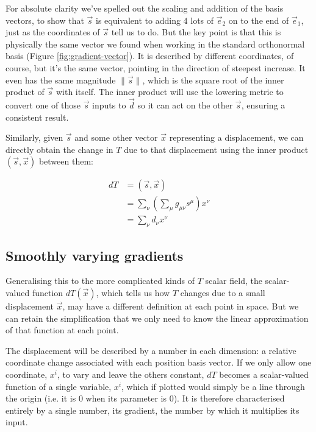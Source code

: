 For absolute clarity we've spelled out the scaling and addition of the basis vectors, to show that $\vec{s}$ is equivalent to adding $4$ lots of $\vec{e}_2$ on to the end of $\vec{e}_1$, just as the coordinates of $\vec{s}$ tell us to do. But the key point is that this is physically the same vector we found when working in the standard orthonormal basis (Figure \ref{fig:gradient-vector}). It is described by different coordinates, of course, but it's the same vector, pointing in the direction of steepest increase. It even has the same magnitude $\|\vec{s}\|$, which is the square root of the inner product of $\vec{s}$ with itself. The inner product will use the lowering metric to convert one of those $\vec{s}$ inputs to $\vec{d}$ so it can act on the other $\vec{s}$, ensuring a consistent result.

Similarly, given $\vec{s}$ and some other vector $\vec{x}$ representing a displacement, we can directly obtain the change in $T$ due to that displacement using the inner product $(\vec{s}, \vec{x})$ between them:

\begin{equation}
\begin{split}
dT &= (\vec{s}, \vec{x}) \\
   &= \sum_{\nu} \left( \sum_{\mu} g_{\mu\nu} s^{\mu} \right) x^{\nu} \\
    &= \sum_{\nu} d_{\nu} x^{\nu}
\end{split}
\end{equation}

\subsection{Smoothly varying gradients}

Generalising this to the more complicated kinds of $T$ scalar field, the scalar-valued function $dT(\vec{x})$, which tells us how $T$ changes due to a small displacement $\vec{x}$, may have a different definition at each point in space. But we can retain the simplification that we only need to know the linear approximation of that function at each point.

The displacement will be described by a number in each dimension: a relative coordinate change associated with each position basis vector. If we only allow one coordinate, $x^i$, to vary and leave the others constant, $dT$ becomes a scalar-valued function of a single variable, $x^i$, which if plotted would simply be a line through the origin (i.e. it is $0$ when its parameter is $0$). It is therefore characterised entirely by a single number, its gradient, the number by which it multiplies its input.

